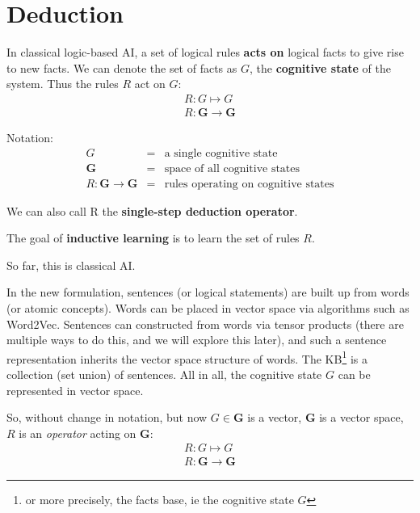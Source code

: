 \documentclass[12pt]{article}
\begin{document}
\section{Deduction}


In classical logic-based AI, a set of logical rules \textbf{acts on} logical facts to give rise to new facts.  We can denote the set of facts as $G$, the \textbf{cognitive state} of the system.  Thus the rules $R$ act on $G$:
\begin{eqnarray}
 R: G \mapsto G \nonumber \\
 R : \mathbf{G} \rightarrow \mathbf{G} \nonumber
\end{eqnarray}

Notation:
\begin{eqnarray}
G &=& \mbox{a single cognitive state} \nonumber \\
\mathbf{G} &=& \mbox{space of all cognitive states} \nonumber \\
R : \mathbf{G} \rightarrow \mathbf{G} &=& \mbox{rules operating on cognitive states} \nonumber
\end{eqnarray}

We can also call R the \textbf{single-step deduction operator}.

The goal of \textbf{inductive learning} is to learn the set of rules $R$.

So far, this is classical AI.

In the new formulation, sentences (or logical statements) are built up from words (or atomic concepts).  Words can be placed in vector space via algorithms such as Word2Vec.  Sentences can constructed from words via tensor products (there are multiple ways to do this, and we will explore this later), and such a sentence representation inherits the vector space structure of words.  The KB\footnote{or more precisely, the facts base, ie the cognitive state $G$} is a collection (set union) of sentences.  All in all, the cognitive state $G$ can be represented in vector space.

So, without change in notation, but now $G \in \mathbf{G}$ is a vector, $\mathbf{G}$ is a vector space, $R$ is an \textit{operator} acting on $\mathbf{G}$:
\begin{eqnarray}
 R: G \mapsto G \nonumber \\
 R : \mathbf{G} \rightarrow \mathbf{G} \nonumber
\end{eqnarray}
\end{document}
